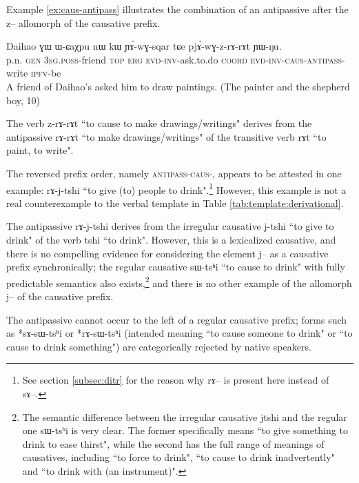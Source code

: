 \documentclass[oldfontcommands,oneside,a4paper,11pt]{article}
\newcommand{\ipa}[1]{{\phon \mbox{#1}}} %
\begin{document}
Example \ref{ex:caus-antipass} illustrates the combination of an antipassive after the \ipa{z--} allomorph of the causative prefix.

\begin{exe}
\ex \label{ex:caus-antipass}
\gll  Daihao 	\ipa{ɣɯ} 	\ipa{ɯ-ɕaχpu} 	\ipa{nɯ} 	\ipa{kɯ} 	\ipa{ɲɤ́-wɣ-sqar} 	\ipa{tɕe}  \ipa{pjɤ́-wɣ-z-rɤ-rɤt} 	\ipa{ɲɯ-ŋu.}   \\
  p.n. \textsc{gen} 3\textsc{sg.poss}-friend \textsc{top} \textsc{erg} \textsc{evd-inv}-ask.to.do \textsc{coord} \textsc{evd-inv-caus-antipass}-write \textsc{ipfv}-be  \\
 \glt A friend of Daihao's asked him to draw paintings.  (The painter and the shepherd boy, 10)
\end{exe} 

The verb \ipa{z-rɤ-rɤt} ``to cause to make drawings/writings" derives from the antipassive \ipa{rɤ-rɤt} ``to make drawings/writings" of the transitive verb \ipa{rɤt} ``to paint, to write".

The reversed prefix order, namely \textsc{antipass}-\textsc{caus}-, appears to be attested in one example:  \ipa{rɤ-j-tshi} ``to give (to) people to drink".\footnote{See section \ref{subsec:ditr} for the reason why \ipa{rɤ}-- is present here instead of \ipa{sɤ}--.} However, this example is not a real counterexample to the verbal template in Table \ref{tab:template:derivational}.

The antipassive  \ipa{rɤ-j-tshi} derives from the irregular causative \ipa{j-tshi} ``to give to drink" of the verb \ipa{tshi} ``to drink".  However, this is a lexicalized causative, and there is no compelling evidence for considering the element \ipa{j--} as a causative prefix synchronically;  the regular causative \ipa{sɯ-tsʰi} ``to cause  to drink" with fully predictable semantics also exists,\footnote{The semantic difference between the irregular causative  \ipa{jtshi} and the regular one \ipa{sɯ-tsʰi} is very clear. The former specifically means ``to give something to drink to ease thirst", while the second has the full range of meanings of causatives, including ``to force to drink", ``to cause to drink inadvertently" and ``to drink with (an instrument)". } and there is no other example of the allomorph \ipa{j}-- of the causative prefix.

The antipassive cannot occur to the left of a regular causative prefix; forms such as *sɤ-sɯ-tsʰi or *rɤ-sɯ-tsʰi (intended meaning ``to cause someone to drink" or ``to cause  to drink something") are categorically rejected by native speakers.
\end{document}
